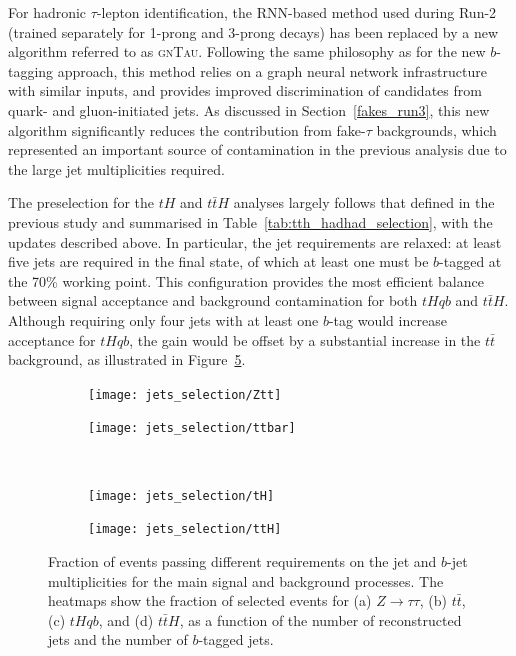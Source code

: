 For hadronic $\tau$-lepton identification, the RNN-based method used during Run-2 (trained separately for 1-prong and 3-prong decays) has been replaced by a new algorithm referred to as \textsc{gnTau}. Following the same philosophy as for the new $b$-tagging approach, this method relies on a graph neural network infrastructure with similar inputs, and provides improved discrimination of \tauhadvis candidates from quark- and gluon-initiated jets. As discussed in Section~\ref{fakes_run3}, this new algorithm significantly reduces the contribution from fake-$\tau$ backgrounds, which represented an important source of contamination in the previous analysis due to the large jet multiplicities required.

The preselection for the $tH$ and $t\bar{t}H$ analyses largely follows that defined in the previous study and summarised in Table~\ref{tab:tth_hadhad_selection}, with the updates described above. In particular, the jet requirements are relaxed: at least five jets are required in the final state, of which at least one must be $b$-tagged at the 70\% working point. This configuration provides the most efficient balance between signal acceptance and background contamination for both $tHqb$ and $t\bar{t}H$. Although requiring only four jets with at least one $b$-tag would increase acceptance for $tHqb$, the gain would be offset by a substantial increase in the $t\bar{t}$ background, as illustrated in Figure~\ref{jets_selection}. 
\begin{figure}[htbp]
    \centering
    \begin{subfigure}[b]{0.45\textwidth}
      \centering
      \texttt{[image: jets\_selection/Ztt]}
      \caption{}
      \label{fig:jetsel_ztt}
    \end{subfigure}
    \hfill
    \begin{subfigure}[b]{0.45\textwidth}
      \centering
      \texttt{[image: jets\_selection/ttbar]}
      \caption{}
      \label{fig:jetsel_ttbar}
    \end{subfigure}
    \\[0.3cm]
    \begin{subfigure}[b]{0.45\textwidth}
      \centering
      \texttt{[image: jets\_selection/tH]}
      \caption{}
      \label{fig:jetsel_th}
    \end{subfigure}
    \hfill
    \begin{subfigure}[b]{0.45\textwidth}
      \centering
      \texttt{[image: jets\_selection/ttH]}
      \caption{}
      \label{fig:jetsel_tth}
    \end{subfigure}
    \caption{
      Fraction of events passing different requirements on the jet and $b$-jet multiplicities
      for the main signal and background processes. 
      The heatmaps show the fraction of selected events for (a) $Z\to\tau\tau$, (b) $t\bar{t}$, (c) $tHqb$, and (d) $t\bar{t}H$, 
      as a function of the number of reconstructed jets and the number of $b$-tagged jets.
    }
    \label{jets_selection}
  \end{figure}
  
